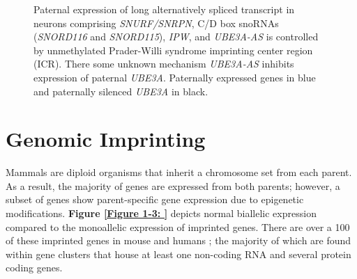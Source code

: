 {\begin{figure}
{
}

\caption{Paternal expression of long alternatively spliced transcript in neurons comprising \textit{SNURF/SNRPN}, C/D box snoRNAs (\textit{SNORD116} and \textit{SNORD115}), \textit{IPW}, and \textit{UBE3A-AS} is controlled by unmethylated Prader-Willi syndrome imprinting center region (ICR). There some unknown mechanism \textit{UBE3A-AS} inhibits expression of paternal \textit{UBE3A}. Paternally expressed genes in blue and paternally silenced \textit{UBE3A} in black.}
\label{Figure 1-2: }
\end{figure}

\section{Genomic Imprinting}

Mammals are diploid organisms that inherit a chromosome set from each parent. As a result, the majority of genes are expressed from both parents; however, a subset of genes show parent-specific gene expression due to epigenetic modifications. \textbf{Figure \ref{Figure 1-3: }} depicts normal biallelic expression compared to the monoallelic expression of imprinted genes. There are over a 100 of these imprinted genes in mouse and humans \cite{Radford2011,Santoro2011}; the majority of which are found within gene clusters that house at least one non-coding RNA and several protein coding genes.

\begin{figure}[!ht]
\centering
\end{figure}}
